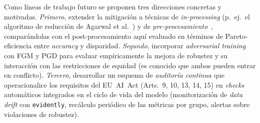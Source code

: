 \documentclass[11pt,a4paper]{article}
\begin{document}
Como líneas de trabajo futuro se proponen tres direcciones concretas y motivadas. \emph{Primero}, extender la mitigación a técnicas de \emph{in-processing} (p.\ ej.\ el algoritmo de reducción de Agarwal et al.~\cite{agarwal2018reductions}) y de \emph{pre-procesamiento}~\cite{calmon2017optimized}, comparándolas con el post-procesamiento aquí evaluado en términos de Pareto-eficiencia entre \textit{accuracy} y disparidad. \emph{Segundo}, incorporar \textit{adversarial training} con FGM y PGD para evaluar empíricamente la mejora de robustez y su interacción con las restricciones de equidad (es conocido que ambos pueden entrar en conflicto). \emph{Tercero}, desarrollar un esquema de \emph{auditoría continua} que operacionalice los requisitos del EU~AI~Act (Arts.~9, 10, 13, 14, 15) en \textit{checks} automáticos integrados en el ciclo de vida del modelo (monitorización de \textit{data drift} con \texttt{evidently}, recálculo periódico de las métricas por grupo, alertas sobre violaciones de robustez).


\end{document}
